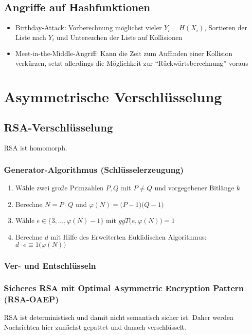 \subsection{Angriffe auf Hashfunktionen}
\begin{itemize}
	\item Birthday-Attack: Vorberechnung möglichst vieler \(Y_i = H(X_i)\), Sortieren der Liste nach \(Y_i\) und Untersuchen der Liste auf Kollisionen
	\item Meet-in-the-Middle-Angriff: Kann die Zeit zum Auffinden einer Kollision verkürzen, setzt allerdings die Möglichkeit zur "`Rückwärtsberechnung"' voraus
\end{itemize}



\section{Asymmetrische Verschlüsselung}

\subsection{RSA-Verschlüsselung}
RSA ist homomorph.

\subsubsection{Generator-Algorithmus (Schlüsselerzeugung)}
\begin{enumerate}
	\item Wähle zwei große Primzahlen \(P,Q\) mit \(P \neq Q\) und vorgegebener Bitlänge \(k\)
	\item Berechne \(N = P \cdot Q\) und \(\varphi(N) = \big(P-1\big)\big(Q-1\big)\)
	\item Wähle \(e \in \{3,\ldots,\varphi(N)-1\}\) mit \(ggT\big(e, \varphi(N)\big) = 1\)
	\item Berechne \(d\) mit Hilfe des Erweiterten Euklidischen Algorithmus: \(d \cdot e \equiv 1 \big(\varphi(N)\big)\)
\end{enumerate}

\subsubsection{Ver- und Entschlüsseln}

\subsubsection{Sicheres RSA mit Optimal Asymmetric Encryption Pattern (RSA-OAEP)}
RSA ist deterministisch und damit nicht semantisch sicher ist. Daher werden Nachrichten hier zunächst gepattet und danach verschlüsselt. 

